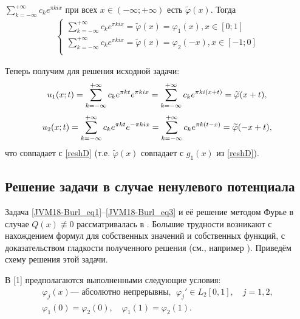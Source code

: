   $ \sum\limits_{k=-\infty}^{+\infty}c_{k}e^{\pi
kix}$ при всех $x\in (-\infty;+\infty)$ есть
$\widetilde{\varphi}(x)$. Тогда
\begin{equation*}
    \begin{matrix}
    \left\{
    \begin{matrix}
    \sum\limits_{k=-\infty}^{+\infty}c_{k}e^{\pi
kix}= \widetilde{\varphi}(x)=\varphi_{1}(x), x\in [0;1]\\
   \sum\limits_{k=-\infty}^{+\infty}c_{k}e^{\pi
kix}=\widetilde{\varphi}(x)=\varphi_{2}(-x), x\in [-1;0]\\
    \end{matrix} \right.
    \end{matrix}
\end{equation*}

Теперь получим для решения исходной задачи:
\begin{equation*}
   u_{1}(x;t)= \sum\limits_{k=-\infty}^{+\infty}c_{k}e^{\pi kt}e^{\pi kix}= \sum\limits_{k=-\infty}^{+\infty}c_{k} e^{\pi ki(x+t)}= \widetilde{\varphi}(x+t),\\
\end{equation*}
\begin{equation*}
   u_{2}(x;t)= \sum\limits_{k=-\infty}^{+\infty}c_{k}e^{\pi kt}e^{-\pi kix}=\sum\limits_{k=-\infty}^{+\infty}c_{k}e^{\pi k(t-x)}
   =\widetilde{\varphi}(-x+t),\\
\end{equation*}
что совпадает с \eqref{reshD} (т.е. $\widetilde{\varphi}(x)$
совпадает с $g_1(x)$ из \eqref{reshD}).

\subsection{ Решение задачи  в случае ненулевого потенциала}



Задача \eqref{JVM18-Burl_eq1}--\eqref{JVM18-Burl_eq3} и её решение
методом Фурье  в случае   $Q(x)\not \equiv 0$ рассматривалась в
\cite{Burl-SGU-16,burl-JVM19}. Большие трудности возникают с
нахождением формул для собственных значений и собственных функций, с
доказательством гладкости полученного решения (см., например
\cite{Burl-SGU-16}). Приведём схему решения этой задачи.



В [1] предполагаются выполненными     следующие условия:
\begin{equation}\label{JVM18-Burl-eq4}
 \begin{array}{c}
\varphi_j(x) \text{--- абсолютно непрерывны}, \ \  \varphi_j' \in
L_2[0,1], \quad j=1,2,\\
\varphi_1(0)=\varphi_2(0), \quad \varphi_1(1)=\varphi_2(1).
 \end{array}
\end{equation}



